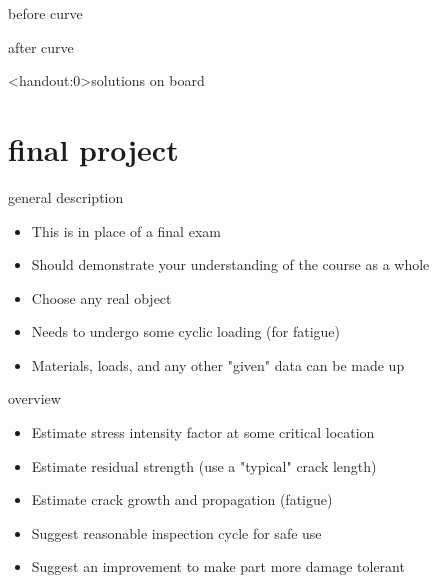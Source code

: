 \documentclass[10pt]{beamer}
\begin{document}
\begin{frame}{before curve}
	
\end{frame}

\begin{frame}{after curve}
	
\end{frame}

\begin{frame}<handout:0>{solutions}
	on board
\end{frame}

\section{final project}

\begin{frame}{general description}
	\begin{itemize}[<+->]
		\item This is in place of a final exam
		\item Should demonstrate your understanding of the course as a whole
		\item Choose any real object
		\item Needs to undergo some cyclic loading (for fatigue)
		\item Materials, loads, and any other "given" data can be made up
	\end{itemize}
\end{frame}

\begin{frame}{overview}
	\begin{itemize}[<+->]
		\item Estimate stress intensity factor at some critical location
		\item Estimate residual strength (use a "typical" crack length)
		\item Estimate crack growth and propagation (fatigue)
		\item Suggest reasonable inspection cycle for safe use
		\item Suggest an improvement to make part more damage tolerant
	\end{itemize}
\end{frame}
\end{document}

